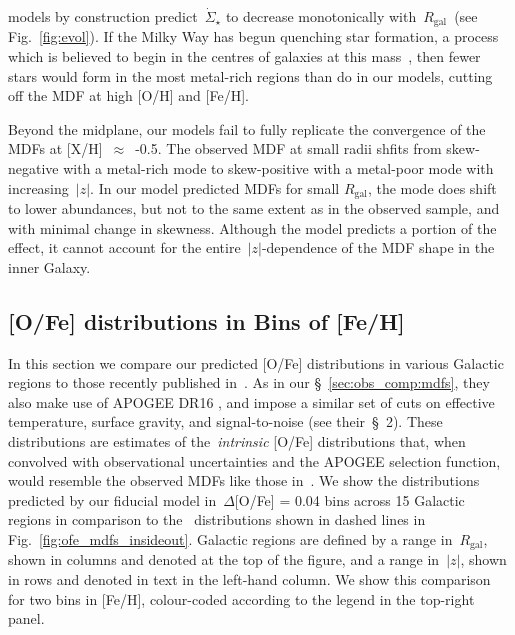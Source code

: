 \documentclass[fleqn, usenatbib]{mnras}
\begin{document}
models by construction predict~$\dot{\Sigma}_\star$ to decrease monotonically 
with~$R_\text{gal}$~(see Fig.~\ref{fig:evol}). If the Milky Way has begun 
quenching star formation, a process which is believed to begin in the centres 
of galaxies at this mass~\citep[e.g.][]{Ellison2020b}, then fewer stars would 
form in the most metal-rich regions than do in our models, cutting off the MDF 
at high [O/H] and [Fe/H]. 
\par 
Beyond the midplane, our models fail to fully replicate the convergence of the 
MDFs at [X/H]~$\approx$~-0.5. The observed MDF at small radii shfits from 
skew-negative with a metal-rich mode to skew-positive with a metal-poor 
mode with increasing~$\left|z\right|$. In our model predicted MDFs for small 
$R_\text{gal}$, the mode does shift to lower abundances, but not to the same 
extent as in the observed sample, and with minimal change in skewness. 
Although the model predicts a portion of the effect, it cannot account for the 
entire~$\left|z\right|$-dependence of the MDF shape in the inner Galaxy. 

\subsection{[O/Fe] distributions in Bins of [Fe/H]} 
\label{sec:obs_comp:ofe_dists} 
In this section we compare our predicted [O/Fe] distributions in various 
Galactic regions to those recently published in~\citet{Vincenzo2021a}. As in our 
\S~\ref{sec:obs_comp:mdfs}, they also make use of APOGEE DR16 
\citep{Ahumada2020, Majewski2017}, and impose a similar set of cuts on 
effective temperature, surface gravity, and signal-to-noise (see their~\S~2). 
These distributions are estimates of the~\textit{intrinsic} [O/Fe] 
distributions that, when 
convolved with observational uncertainties and the APOGEE selection function, 
would resemble the observed MDFs like those in~\citet{Hayden2015}. We show the 
distributions predicted by our fiducial model in~$\Delta$[O/Fe] = 0.04 bins 
across 15 Galactic regions in comparison to the~\citet{Vincenzo2021a} 
distributions shown in dashed lines in Fig.~\ref{fig:ofe_mdfs_insideout}. 
Galactic regions 
are defined by a range in~$R_\text{gal}$, shown in columns and denoted at the 
top of the figure, and a range in~$\left|z\right|$, shown in rows and denoted 
in text in the left-hand column. We show this comparison for two bins in 
[Fe/H], colour-coded according to the legend in the top-right panel. 
\end{document}
